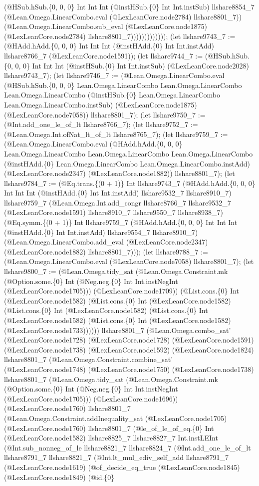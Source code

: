 \documentclass[11pt]{article}
\begin{document}
(@HSub.hSub.\{0, 0, 0\} Int Int Int (@instHSub.\{0\} Int Int.instSub) llshare8854\_7 (@Lean.Omega.LinearCombo.eval (@LexLeanCore.node2784) llshare8801\_7)) (@Lean.Omega.LinearCombo.sub\_eval (@LexLeanCore.node1875) (@LexLeanCore.node2784) llshare8801\_7))))))))))))); (let llshare9743\_7 := (@HAdd.hAdd.\{0, 0, 0\} Int Int Int (@instHAdd.\{0\} Int Int.instAdd) llshare8766\_7 (@LexLeanCore.node1591)); (let llshare9744\_7 := (@HSub.hSub.\{0, 0, 0\} Int Int Int (@instHSub.\{0\} Int Int.instSub) (@LexLeanCore.node2028) llshare9743\_7); (let llshare9746\_7 := (@Lean.Omega.LinearCombo.eval (@HSub.hSub.\{0, 0, 0\} Lean.Omega.LinearCombo Lean.Omega.LinearCombo Lean.Omega.LinearCombo (@instHSub.\{0\} Lean.Omega.LinearCombo Lean.Omega.LinearCombo.instSub) (@LexLeanCore.node1875) (@LexLeanCore.node7058)) llshare8801\_7); (let llshare9750\_7 := (@Int.add\_one\_le\_of\_lt llshare8766\_7); (let llshare9752\_7 := (@Lean.Omega.Int.ofNat\_lt\_of\_lt llshare8765\_7); (let llshare9759\_7 := (@Lean.Omega.LinearCombo.eval (@HAdd.hAdd.\{0, 0, 0\} Lean.Omega.LinearCombo Lean.Omega.LinearCombo Lean.Omega.LinearCombo (@instHAdd.\{0\} Lean.Omega.LinearCombo Lean.Omega.LinearCombo.instAdd) (@LexLeanCore.node2347) (@LexLeanCore.node1882)) llshare8801\_7); (let llshare9784\_7 := (@Eq.trans.\{(0 + 1)\} Int llshare9743\_7 (@HAdd.hAdd.\{0, 0, 0\} Int Int Int (@instHAdd.\{0\} Int Int.instAdd) llshare9532\_7 llshare8910\_7) llshare9759\_7 (@Lean.Omega.Int.add\_congr llshare8766\_7 llshare9532\_7 (@LexLeanCore.node1591) llshare8910\_7 llshare9550\_7 llshare8938\_7) (@Eq.symm.\{(0 + 1)\} Int llshare9759\_7 (@HAdd.hAdd.\{0, 0, 0\} Int Int Int (@instHAdd.\{0\} Int Int.instAdd) llshare9554\_7 llshare8910\_7) (@Lean.Omega.LinearCombo.add\_eval (@LexLeanCore.node2347) (@LexLeanCore.node1882) llshare8801\_7))); (let llshare9788\_7 := (@Lean.Omega.LinearCombo.eval (@LexLeanCore.node7058) llshare8801\_7); (let llshare9800\_7 := (@Lean.Omega.tidy\_sat (@Lean.Omega.Constraint.mk (@Option.some.\{0\} Int (@Neg.neg.\{0\} Int Int.instNegInt (@LexLeanCore.node1705))) (@LexLeanCore.node1709)) (@List.cons.\{0\} Int (@LexLeanCore.node1582) (@List.cons.\{0\} Int (@LexLeanCore.node1582) (@List.cons.\{0\} Int (@LexLeanCore.node1582) (@List.cons.\{0\} Int (@LexLeanCore.node1582) (@List.cons.\{0\} Int (@LexLeanCore.node1582) (@LexLeanCore.node1733)))))) llshare8801\_7 (@Lean.Omega.combo\_sat' (@LexLeanCore.node1728) (@LexLeanCore.node1728) (@LexLeanCore.node1591) (@LexLeanCore.node1738) (@LexLeanCore.node1592) (@LexLeanCore.node1824) llshare8801\_7 (@Lean.Omega.Constraint.combine\_sat' (@LexLeanCore.node1748) (@LexLeanCore.node1750) (@LexLeanCore.node1738) llshare8801\_7 (@Lean.Omega.tidy\_sat (@Lean.Omega.Constraint.mk (@Option.some.\{0\} Int (@Neg.neg.\{0\} Int Int.instNegInt (@LexLeanCore.node1705))) (@LexLeanCore.node1696)) (@LexLeanCore.node1760) llshare8801\_7 (@Lean.Omega.Constraint.addInequality\_sat (@LexLeanCore.node1705) (@LexLeanCore.node1760) llshare8801\_7 (@le\_of\_le\_of\_eq.\{0\} Int (@LexLeanCore.node1582) llshare8825\_7 llshare8827\_7 Int.instLEInt (@Int.sub\_nonneg\_of\_le llshare8821\_7 llshare8824\_7 (@Int.add\_one\_le\_of\_lt llshare8791\_7 llshare8821\_7 (@Int.lt\_mul\_ediv\_self\_add llshare8791\_7 (@LexLeanCore.node1619) (@of\_decide\_eq\_true (@LexLeanCore.node1845) (@LexLeanCore.node1849) (@id.\{0\} 
\end{document}
